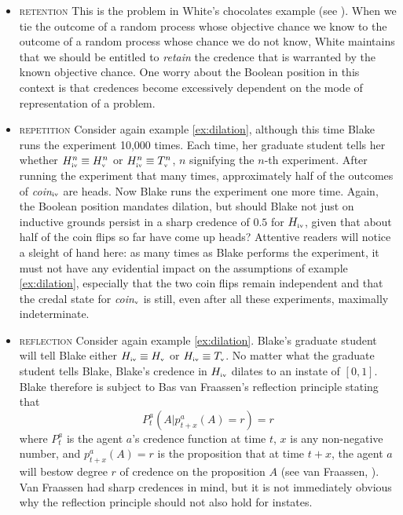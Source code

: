 \documentclass[11pt]{article}
\begin{document}
\begin{itemize}
\item \textsc{retention} This is the problem in White's chocolates
  example (see ). When we tie the outcome of a
  random process whose objective chance we know to the outcome of a
  random process whose chance we do not know, White maintains that we
  should be entitled to \emph{retain} the credence that is warranted
  by the known objective chance. One worry about the Boolean position
  in this context is that credences become excessively dependent on
  the mode of representation of a problem.
\item \textsc{repetition} Consider again example \ref{ex:dilation},
  although this time Blake runs the experiment 10,000 times. Each
  time, her graduate student tells her whether
  $H^{n}_{\mbox{\tiny{iv}}}\equiv{}H^{n}_{\mbox{\tiny{v}}}$ or
  $H^{n}_{\mbox{\tiny{iv}}}\equiv{}T^{n}_{\mbox{\tiny{v}}}$, $n$
  signifying the $n$-th experiment. After running the experiment that
  many times, approximately half of the outcomes of
  \textit{coin}$_{\mbox{\tiny{iv}}}$ are heads. Now Blake runs the
  experiment one more time. Again, the Boolean position mandates
  dilation, but should Blake not just on inductive grounds persist in
  a sharp credence of $0.5$ for $H_{\mbox{\tiny{iv}}}$, given that
  about half of the coin flips so far have come up heads? Attentive
  readers will notice a sleight of hand here: as many times as Blake
  performs the experiment, it must not have any evidential impact on
  the assumptions of example \ref{ex:dilation}, especially that the
  two coin flips remain independent and that the credal state for 
  \textit{coin}$_{\mbox{\tiny{v}}}$ is still, even after all these
  experiments, maximally indeterminate. 
\item \textsc{reflection} Consider again example \ref{ex:dilation}.
  Blake's graduate student will tell Blake either
  $H_{\mbox{\tiny{iv}}}\equiv{}H_{\mbox{\tiny{v}}}$ or
  $H_{\mbox{\tiny{iv}}}\equiv{}T_{\mbox{\tiny{v}}}$. No matter what
  the graduate student tells Blake, Blake's credence in
  $H_{\mbox{\tiny{iv}}}$ dilates to an instate of $[0,1]$. Blake
  therefore is subject to Bas van Fraassen's reflection principle
  stating that
  \begin{equation}
    \label{eq:reflection}
    P_{t}^{a}(A|p_{t+x}^{a}(A)=r)=r
  \end{equation}
  where $P_{t}^{a}$ is the agent $a$'s credence function at time $t$,
  $x$ is any non-negative number, and $p_{t+x}^{a}(A)=r$ is the
  proposition that at time $t+x$, the agent $a$ will bestow degree $r$
  of credence on the proposition $A$ (see van
  Fraassen, ). Van Fraassen had sharp
  credences in mind, but it is not immediately obvious why the
  reflection principle should not also hold for instates.
\end{itemize}
\end{document}
